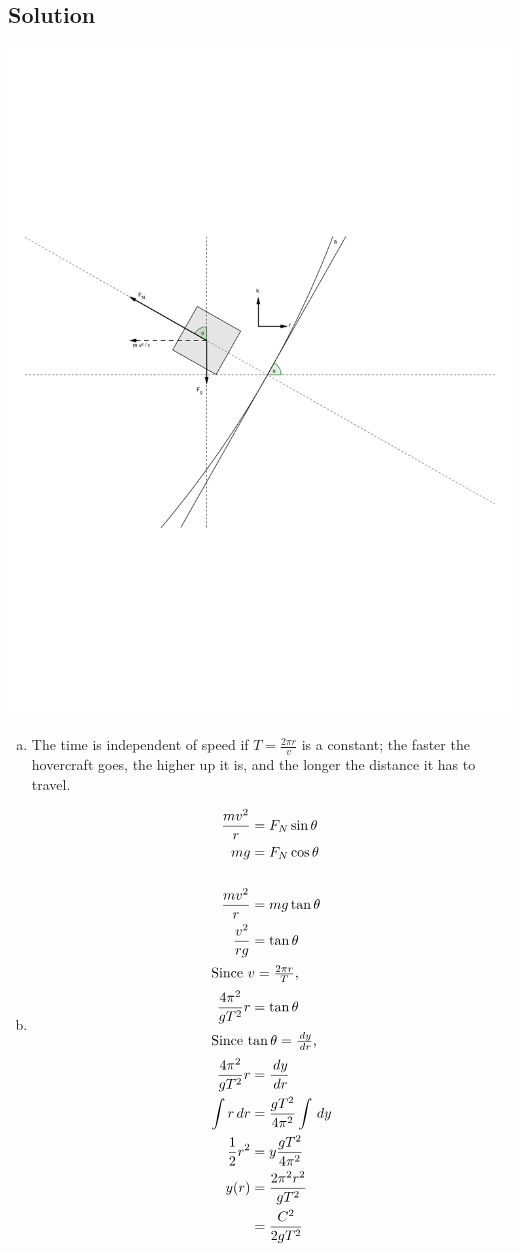 \documentclass[solutions]{esg8012pset}
\renewcommand{\d}{\,d}
\begin{document}
\subsection{Solution}
  \begin{center}\includegraphics[width=.5\textwidth]{2009-10-02_Diagram_7_2}\end{center}
  \begin{enumerate}[a)]
    \item The time is independent of speed if $T = \frac{2\pi r}{v}$ is a constant; the faster the hovercraft goes, the higher up it is, and the longer the distance it has to travel.
    \item \begin{align*}
      \frac{mv^2}{r} & = F_N\sin\theta \\
      m g & = F_N\cos\theta \\
      \\
      \frac{mv^2}{r} & = m g \tan\theta \\
      \frac{v^2}{r g} & = \tan\theta \\
      \intertext{Since $v = \frac{2\pi r}{T}$,}
      \frac{4\pi^2}{g T^2}r & = \tan\theta \\
      \intertext{Since $\tan\theta = \frac{\d y}{\d r}$,}
      \frac{4\pi^2}{g T^2}r & = \frac{\d y}{\d r} \\
      \int r \d{r} & = \frac{g T^2}{4\pi^2} \int \d y \\
      \frac{1}{2}r^2 & = y\frac{g T^2}{4\pi^2} \\
      y(r) & = \frac{2 \pi^2 r^2}{g T^2} \\
       & = \frac{C^2}{2g T^2}
    \end{align*}
  \end{enumerate}
\end{document}

